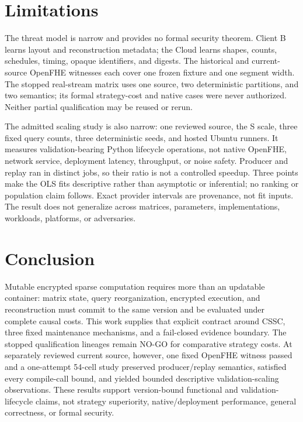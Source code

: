 \section{Limitations}\label{limitations}

The threat model is narrow and provides no formal security theorem. Client B
learns layout and reconstruction metadata; the Cloud learns shapes, counts,
schedules, timing, opaque identifiers, and digests. The historical and
current-source OpenFHE witnesses each cover one frozen fixture and one segment
width. The stopped real-stream matrix uses one source, two deterministic
partitions, and two semantics; its formal strategy-cost and native cases were
never authorized. Neither partial qualification may be reused or rerun.

The admitted scaling study is also narrow: one reviewed source, the S scale,
three fixed query counts, three deterministic seeds, and hosted Ubuntu runners.
It measures validation-bearing Python lifecycle operations, not native
OpenFHE, network service, deployment latency, throughput, or noise safety.
Producer and replay ran in distinct jobs, so their ratio is not a controlled
speedup. Three points make the OLS fits descriptive rather than asymptotic or
inferential; no ranking or population claim follows. Exact provider intervals
are provenance, not fit inputs. The result does not generalize across matrices,
parameters, implementations, workloads, platforms, or adversaries.

\section{Conclusion}\label{conclusion}

Mutable encrypted sparse computation requires more than an updatable container:
matrix state, query reorganization, encrypted execution, and reconstruction
must commit to the same version and be evaluated under complete causal costs.
This work supplies that explicit contract around CSSC, three fixed maintenance
mechanisms, and a fail-closed evidence boundary. The stopped qualification
lineages remain NO-GO for comparative strategy costs. At separately reviewed
current source, however, one fixed OpenFHE witness passed and a one-attempt
54-cell study preserved producer/replay semantics, satisfied every compile-call
bound, and yielded bounded descriptive validation-scaling observations. These
results support version-bound functional and validation-lifecycle claims, not
strategy superiority, native/deployment performance, general correctness, or
formal security.
